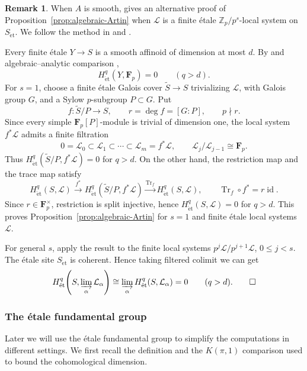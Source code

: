 \documentclass[11pt]{article}
\theoremstyle{definition}
\newtheorem{remark}[theorem]{Remark}
\newcommand{\Zp}{\mathbb Z_p}
\newcommand{\cL}{\mathcal L}
\newcommand{\et}{\mathrm{\acute et}}
\begin{document}
\begin{remark}%
\label{rem:smooth-local-system-Artin}
When \(A\) is smooth, \cite[Remark~7.4(2)]{BhattMathewArc}
gives an alternative proof of Proposition~\ref{prop:algebraic-Artin}
when $\cL$ is a finite \'etale \(\Zp/p^s\)-local system on \(S_{\et}\).  
We follow the method in \cite[proof of Theorem~7.3]{BhattMathewArc} 
and \cite[Tags~0A3R and~03SH]{Stacks}.

Every finite \'etale \(Y\to S\) is a smooth affinoid of dimension
at most \(d\).  By \cite[Remark~7.4(2)]{BhattMathewArc} and
algebraic--analytic comparison \cite[Corollary~3.2.3]{HuberEtale},
\[
 H^q_{\et}(Y,\mathbf F_p)=0\qquad(q>d).
\]
For \(s=1\), choose a finite
\'etale Galois cover \(\widetilde{S}\to S\) trivializing \(\mathcal L\),
with Galois group \(G\), and a Sylow \(p\)-subgroup \(P\subset G\).  Put
\[
 f:\widetilde{S}/P\longrightarrow S,\qquad
 r=\deg f=[G:P],\qquad p\nmid r.
\]
Since every simple \(\mathbf F_p[P]\)-module is trivial of dimension
one, the local system \(f^*\mathcal L\) admits a finite filtration
\[
 0=\mathcal L_0\subset\mathcal L_1\subset\cdots
 \subset\mathcal L_m=f^*\mathcal L,\qquad
 \mathcal L_j/\mathcal L_{j-1}\cong\mathbf F_p.
\]
Thus \(H^q_{\et}(\widetilde{S}/P,f^*\mathcal L)=0\) for \(q>d\).
On the other hand, the restriction map and the trace map satisfy
\[
 H^q_{\et}(S,\mathcal L)\xrightarrow{f^*}
 H^q_{\et}(\widetilde{S}/P,f^*\mathcal L)\xrightarrow{\operatorname{Tr}_f}
 H^q_{\et}(S,\mathcal L),\qquad
 \operatorname{Tr}_f\circ f^*=r\operatorname{id}.
\]
Since \(r\in\mathbf F_p^\times\), restriction is split injective, hence $H^q_{\et}(S,\cL)=0$ for $q>d$.
This proves Proposition~\ref{prop:algebraic-Artin} for \(s=1\) and finite \'etale local systems $\cL$. 

For general \(s\), apply the result to the finite local systems
\(p^j\mathcal L/p^{j+1}\mathcal L\), \(0\leq j<s\).
The \'etale site $S_{\et}$ is coherent. Hence taking filtered colimit we can get
\[
 H^q_{\et}\!\left(S,\varinjlim_\alpha\mathcal L_\alpha\right)
 \cong\varinjlim_\alpha H^q_{\et}(S,\mathcal L_\alpha)=0
 \qquad(q>d).
\qedhere
\]
\end{remark}

\subsubsection{The \'etale fundamental group}
\label{subsec:etale-fundamental-group}
Later we will use the \'etale fundamental group to simplify the computations in different settings.
We first recall the definition and the $K(\pi, 1)$ comparison used to bound the cohomological dimension. 
\end{document}
